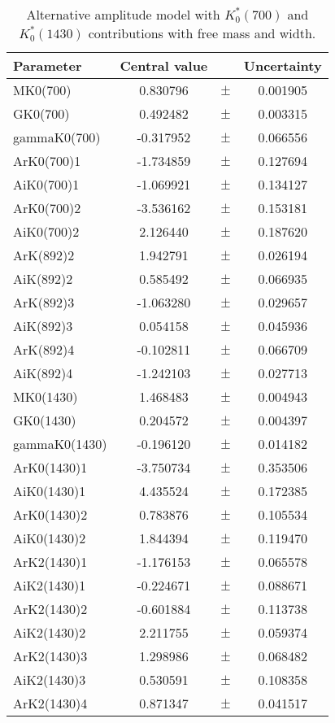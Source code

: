 \begin{table}
\centering
\caption{Alternative amplitude model with $K^*_0(700)$ and $K^*_0(1430)$ contributions with free mass and width.}
\begin{tiny}
\begin{tabular}{lccc}
\toprule
Parameter & Central value & & Uncertainty\\
\midrule 
MK0(700) & 0.830796 & $\pm$ & 0.001905 \\
GK0(700) & 0.492482 & $\pm$ & 0.003315 \\
gammaK0(700) & -0.317952 & $\pm$ & 0.066556 \\
ArK0(700)1 & -1.734859 & $\pm$ & 0.127694 \\
AiK0(700)1 & -1.069921 & $\pm$ & 0.134127 \\
ArK0(700)2 & -3.536162 & $\pm$ & 0.153181 \\
AiK0(700)2 & 2.126440 & $\pm$ & 0.187620 \\
ArK(892)2 & 1.942791 & $\pm$ & 0.026194 \\
AiK(892)2 & 0.585492 & $\pm$ & 0.066935 \\
ArK(892)3 & -1.063280 & $\pm$ & 0.029657 \\
AiK(892)3 & 0.054158 & $\pm$ & 0.045936 \\
ArK(892)4 & -0.102811 & $\pm$ & 0.066709 \\
AiK(892)4 & -1.242103 & $\pm$ & 0.027713 \\
MK0(1430) & 1.468483 & $\pm$ & 0.004943 \\
GK0(1430) & 0.204572 & $\pm$ & 0.004397 \\
gammaK0(1430) & -0.196120 & $\pm$ & 0.014182 \\
ArK0(1430)1 & -3.750734 & $\pm$ & 0.353506 \\
AiK0(1430)1 & 4.435524 & $\pm$ & 0.172385 \\
ArK0(1430)2 & 0.783876 & $\pm$ & 0.105534 \\
AiK0(1430)2 & 1.844394 & $\pm$ & 0.119470 \\
ArK2(1430)1 & -1.176153 & $\pm$ & 0.065578 \\
AiK2(1430)1 & -0.224671 & $\pm$ & 0.088671 \\
ArK2(1430)2 & -0.601884 & $\pm$ & 0.113738 \\
AiK2(1430)2 & 2.211755 & $\pm$ & 0.059374 \\
ArK2(1430)3 & 1.298986 & $\pm$ & 0.068482 \\
AiK2(1430)3 & 0.530591 & $\pm$ & 0.108358 \\
ArK2(1430)4 & 0.871347 & $\pm$ & 0.041517 \\

\end{tabular}
\end{tiny}
\end{table}
